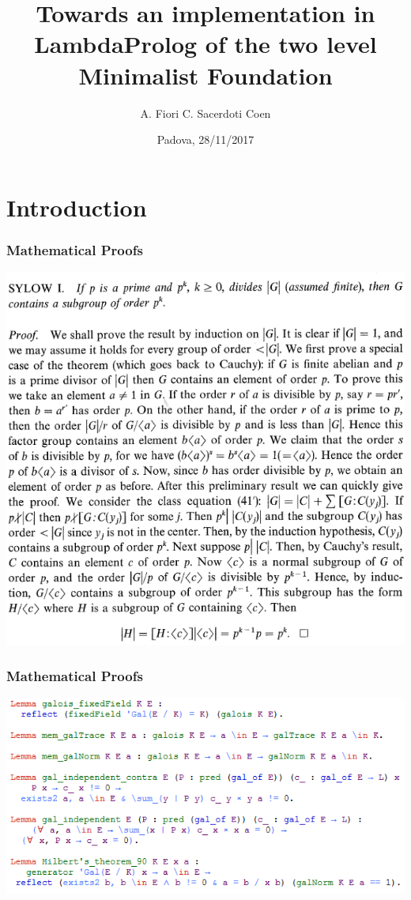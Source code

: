 \documentclass{beamer}
\title{Towards an implementation in LambdaProlog of the two level Minimalist Foundation}
\author{\hspace{1.7cm} A. Fiori \quad \quad C. Sacerdoti Coen}
\institute[University of Bologna]
{
  University of Padova \quad \quad
  University of Bologna
}
\date {Padova, 28/11/2017}
\begin{document}
\begin{frame}
  \titlepage
\end{frame}

\begin{frame}[fragile]
 \tableofcontents
\end{frame}


\section{Introduction}

\begin{frame}
\frametitle{Mathematical Proofs}
\begin{center}
{\includegraphics[width=\textwidth,height=0.8\textheight,keepaspectratio]{proof.png}}
\end{center}
\end{frame}

\begin{frame}
\frametitle{Mathematical Proofs}
\begin{center}
	{\includegraphics[width=\textwidth,height=0.8\textheight,keepaspectratio]{coq2.png}}
\end{center}
\end{frame}
\end{document}
